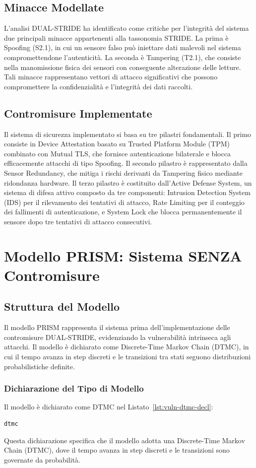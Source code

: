 \subsection{Minacce Modellate}
L'analisi DUAL-STRIDE ha identificato come critiche per l'integrità del sistema due principali minacce appartenenti alla tassonomia STRIDE. La prima è Spoofing (S2.1), in cui un sensore falso può iniettare dati malevoli nel sistema compromettendone l'autenticità. La seconda è Tampering (T2.1), che consiste nella manomissione fisica dei sensori con conseguente alterazione delle letture. Tali minacce rappresentano vettori di attacco significativi che possono compromettere la confidenzialità e l'integrità dei dati raccolti.

\subsection{Contromisure Implementate}
Il sistema di sicurezza implementato si basa su tre pilastri fondamentali. Il primo consiste in Device Attestation basato su Trusted Platform Module (TPM) combinato con Mutual TLS, che fornisce autenticazione bilaterale e blocca efficacemente attacchi di tipo Spoofing. Il secondo pilastro è rappresentato dalla Sensor Redundancy, che mitiga i rischi derivanti da Tampering fisico mediante ridondanza hardware. Il terzo pilastro è costituito dall'Active Defense System, un sistema di difesa attivo composto da tre componenti: Intrusion Detection System (IDS) per il rilevamento dei tentativi di attacco, Rate Limiting per il conteggio dei fallimenti di autenticazione, e System Lock che blocca permanentemente il sensore dopo tre tentativi di attacco consecutivi.

\section{Modello PRISM: Sistema SENZA Contromisure}

\subsection{Struttura del Modello}
Il modello PRISM rappresenta il sistema prima dell'implementazione delle contromisure DUAL-STRIDE, evidenziando la vulnerabilità intrinseca agli attacchi. Il modello è dichiarato come Discrete-Time Markov Chain (DTMC), in cui il tempo avanza in step discreti e le transizioni tra stati seguono distribuzioni probabilistiche definite.

\subsubsection{Dichiarazione del Tipo di Modello}
Il modello è dichiarato come DTMC nel Listato~\ref{lst:vuln-dtmc-decl}:
\begin{lstlisting}[style=mystyle, language=Prolog, caption={Dichiarazione DTMC del modello vulnerabile}, label=lst:vuln-dtmc-decl]
dtmc
\end{lstlisting}
Questa dichiarazione specifica che il modello adotta una Discrete-Time Markov Chain (DTMC), dove il tempo avanza in step discreti e le transizioni sono governate da probabilità.


